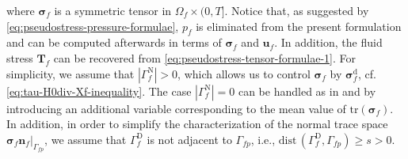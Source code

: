 \documentclass[11pt]{article}
\numberwithin{equation}{section}
\newcommand{\bsi}{{\boldsymbol\sigma}}
\newcommand{\bu}{\mathbf{u}}
\newcommand{\bn}{{\mathbf{n}}}
\newcommand{\0}{{\mathbf{0}}}
\def\bT{\mathbf{T}}
\def\rd{\mathrm{d}}
\def\rD{\mathrm{D}}
\def\rN{\mathrm{N}}
\def\tr{\mathrm{tr}}
\def\dist{\mathrm{dist}\,}
\numberwithin{equation}{section}
\begin{document}
where $\bsi_f$ is a symmetric tensor in $\Omega_f\times (0,T]$.
Notice that, as suggested by \eqref{eq:pseudostress-pressure-formulae}, $p_f$ is eliminated from the present formulation and can be computed afterwards in terms of $\bsi_f$ and $\bu_f$.
In addition, the fluid stress $\bT_f$ can be recovered from \eqref{eq:pseudostress-tensor-formulae-1}.
For simplicity, we assume that $|\Gamma^\rN_f| > 0$, which allows us to control $\bsi_f$ by $\bsi^\rd_f$, cf. \eqref{eq:tau-H0div-Xf-inequality}. The case $|\Gamma^\rN_f| = 0$ can be handled as in \cite{gmor2014} and \cite{gov2020} by introducing an additional
variable corresponding to the mean value of $ \tr(\bsi_f)$. In addition, in order to simplify the characterization of the normal trace space $\bsi_f\bn_f|_{\Gamma_{fp}}$, we assume that $\Gamma^\rD_f$ is not adjacent to $\Gamma_{fp}$, i.e., $\dist(\Gamma^\rD_f,\Gamma_{fp}) \geq s >0$.
\end{document}
